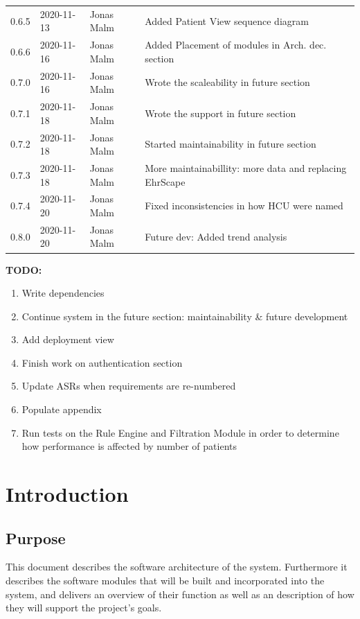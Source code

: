 \documentclass{article}
\begin{document}
\begin{table}
\begin{tabular}{|l|l|l|l|}
0.6.5 & 2020-11-13 & Jonas Malm & Added Patient View sequence diagram\\
0.6.6 & 2020-11-16 & Jonas Malm & Added Placement of modules in Arch. dec. section\\
0.7.0 & 2020-11-16 & Jonas Malm & Wrote the scaleability in future section\\
0.7.1 & 2020-11-18 & Jonas Malm & Wrote the support in future section\\
0.7.2 & 2020-11-18 & Jonas Malm & Started maintainability in future section\\
0.7.3 & 2020-11-18 & Jonas Malm & More maintainabillity: more data and replacing EhrScape\\
0.7.4 & 2020-11-20 & Jonas Malm & Fixed inconsistencies in how HCU were named\\
0.8.0 & 2020-11-20 & Jonas Malm & Future dev: Added trend analysis\\


\hline
\end{tabular}
\end{table}
\restoregeometry

\textbf{TODO:}
\begin{enumerate}[label=(\roman*)]
\item Write dependencies
\item Continue system in the future section: maintainability & future development
\item Add deployment view
\item Finish work on authentication section
\item Update ASRs when requirements are re-numbered
\item Populate appendix
\item Run tests on the Rule Engine and Filtration Module in order to determine how performance is affected by number of patients
\end{enumerate}


\clearpage

\tableofcontents
\clearpage

\section{Introduction}
\subsection{Purpose}
This document describes the software architecture of the system. Furthermore it describes the software modules that will be built and incorporated into the system, and delivers an overview of their function as well as an description of how they will support the project's goals.
\end{document}
